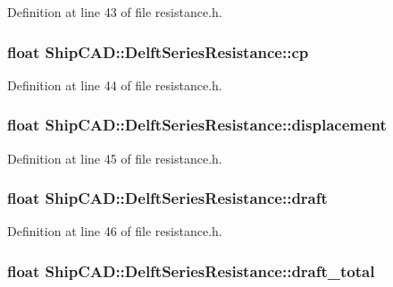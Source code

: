 Definition at line 43 of file resistance.\-h.

\hypertarget{structShipCAD_1_1DelftSeriesResistance_ae489114ad6f1d03758420f77b58de519}{
\subsubsection[{cp}]{\setlength{\rightskip}{0pt plus 5cm}float Ship\-C\-A\-D\-::\-Delft\-Series\-Resistance\-::cp}}\label{structShipCAD_1_1DelftSeriesResistance_ae489114ad6f1d03758420f77b58de519}


Definition at line 44 of file resistance.\-h.

\hypertarget{structShipCAD_1_1DelftSeriesResistance_a1c98fdc7b3c1b28f6f8029af2e009992}{
\subsubsection[{displacement}]{\setlength{\rightskip}{0pt plus 5cm}float Ship\-C\-A\-D\-::\-Delft\-Series\-Resistance\-::displacement}}\label{structShipCAD_1_1DelftSeriesResistance_a1c98fdc7b3c1b28f6f8029af2e009992}


Definition at line 45 of file resistance.\-h.

\hypertarget{structShipCAD_1_1DelftSeriesResistance_a208e360c5ca0d029f9f433a7bc2cade2}{
\subsubsection[{draft}]{\setlength{\rightskip}{0pt plus 5cm}float Ship\-C\-A\-D\-::\-Delft\-Series\-Resistance\-::draft}}\label{structShipCAD_1_1DelftSeriesResistance_a208e360c5ca0d029f9f433a7bc2cade2}


Definition at line 46 of file resistance.\-h.

\hypertarget{structShipCAD_1_1DelftSeriesResistance_a4db81049e448c381019f97dc630d51af}{
\subsubsection[{draft\-\_\-total}]{\setlength{\rightskip}{0pt plus 5cm}float Ship\-C\-A\-D\-::\-Delft\-Series\-Resistance\-::draft\-\_\-total}}\label{structShipCAD_1_1DelftSeriesResistance_a4db81049e448c381019f97dc630d51af}



